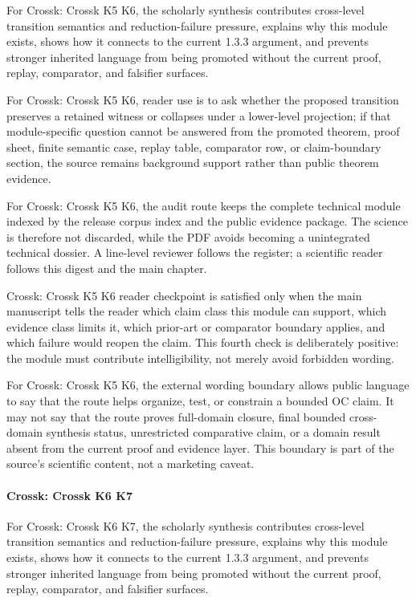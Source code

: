 For Crossk: Crossk K5 K6, the scholarly synthesis contributes cross-level transition semantics and reduction-failure pressure, explains why this module exists, shows how it connects to the current 1.3.3 argument, and prevents stronger inherited language from being promoted without the current proof, replay, comparator, and falsifier surfaces.


For Crossk: Crossk K5 K6, reader use is to ask whether the proposed transition preserves a retained witness or collapses under a lower-level projection; if that module-specific question cannot be answered from the promoted theorem, proof sheet, finite semantic case, replay table, comparator row, or claim-boundary section, the source remains background support rather than public theorem evidence.


For Crossk: Crossk K5 K6, the audit route keeps the complete technical module indexed by the release corpus index and the public evidence package. The science is therefore not discarded, while the PDF avoids becoming a unintegrated technical dossier. A line-level reviewer follows the register; a scientific reader follows this digest and the main chapter.


Crossk: Crossk K5 K6 reader checkpoint is satisfied only when the main manuscript tells the reader which claim class this module can support, which evidence class limits it, which prior-art or comparator boundary applies, and which failure would reopen the claim. This fourth check is deliberately positive: the module must contribute intelligibility, not merely avoid forbidden wording.


For Crossk: Crossk K5 K6, the external wording boundary allows public language to say that the route helps organize, test, or constrain a bounded OC claim. It may not say that the route proves full-domain closure, final bounded cross-domain synthesis status, unrestricted comparative claim, or a domain result absent from the current proof and evidence layer. This boundary is part of the source's scientific content, not a marketing caveat.


\paragraph{Crossk: Crossk K6 K7}

For Crossk: Crossk K6 K7, the scholarly synthesis contributes cross-level transition semantics and reduction-failure pressure, explains why this module exists, shows how it connects to the current 1.3.3 argument, and prevents stronger inherited language from being promoted without the current proof, replay, comparator, and falsifier surfaces.


